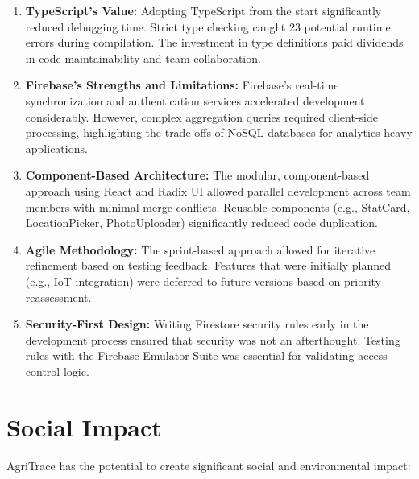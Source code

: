 \documentclass[a4paper,12pt,oneside]{report}
\let\originalitem\item
\renewcommand{\item}{\Needspace{10\baselineskip}\originalitem}
\begin{document}
\begin{enumerate}
    \item \textbf{TypeScript's Value:} Adopting TypeScript from the start significantly reduced debugging time. Strict type checking caught 23 potential runtime errors during compilation. The investment in type definitions paid dividends in code maintainability and team collaboration.

    \item \textbf{Firebase's Strengths and Limitations:} Firebase's real-time synchronization and authentication services accelerated development considerably. However, complex aggregation queries required client-side processing, highlighting the trade-offs of NoSQL databases for analytics-heavy applications.

    \item \textbf{Component-Based Architecture:} The modular, component-based approach using React and Radix UI allowed parallel development across team members with minimal merge conflicts. Reusable components (e.g., StatCard, LocationPicker, PhotoUploader) significantly reduced code duplication.

    \item \textbf{Agile Methodology:} The sprint-based approach allowed for iterative refinement based on testing feedback. Features that were initially planned (e.g., IoT integration) were deferred to future versions based on priority reassessment.

    \item \textbf{Security-First Design:} Writing Firestore security rules early in the development process ensured that security was not an afterthought. Testing rules with the Firebase Emulator Suite was essential for validating access control logic.
\end{enumerate}

\section{Social Impact}

\noindent AgriTrace has the potential to create significant social and environmental impact:
\end{document}
